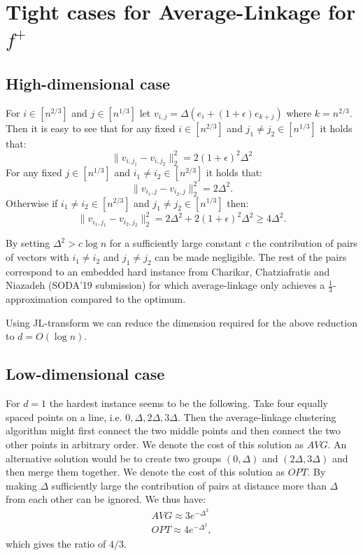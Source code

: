 \documentclass{article}
\begin{document}
\section{Tight cases for Average-Linkage for $f^+$}

\subsection{High-dimensional case}
For $i \in [n^{2/3}]$ and $j \in [n^{1/3}]$ let $v_{i,j} = \Delta (e_i + (1 + \epsilon)e_{k + j})$ where $k = n^{2/3}$.
Then it is easy to see that for any fixed $i \in [n^{2/3}]$ and $j_1 \neq j_2 \in [n^{1/3}]$ it holds that:
$$\|v_{i,j_1} - v_{i, j_2}\|_2^2 = 2 (1 + \epsilon)^2 \Delta^2$$
For any fixed $j \in [n^{1/3}]$ and $i_1 \neq i_2 \in [n^{2/3}]$ it holds that:
$$\|v_{i_1, j} - v_{i_2,j}\|_2^2 = 2 \Delta^2.$$
Otherwise if $i_1 \neq i_2 \in [n^{2/3}]$ and $j_1 \neq j_2  \in [n^{1/3}]$ then:
$$\|v_{i_1, j_1} - v_{i_2, j_2}\|_2^2 = 2 \Delta^2 + 2 (1 + \epsilon)^2 \Delta^2 \ge 4 \Delta^2.$$

By setting $\Delta^2 > c \log n$ for a sufficiently large constant $c$ the contribution of pairs of vectors with $i_1 \neq i_2$ and $j_1 \neq j_2$ can be made negligible. 
The rest of the pairs correspond to an embedded hard instance from Charikar, Chatziafratis and Niazadeh (SODA'19 submission) for which average-linkage only achieves a $\frac13$-approximation compared to the optimum.

Using JL-transform we can reduce the dimension required for the above reduction to $d = O(\log n)$.

\subsection{Low-dimensional case}

For $d = 1$ the hardest instance seems to be the following.
Take four equally spaced points on a line, i.e. $0, \Delta, 2\Delta, 3 \Delta$.
Then the average-linkage clustering algorithm might first connect the two middle points and then connect the two other points in arbitrary order.
We denote the cost of this solution as $AVG$.
An alternative solution would be to create two groups $(0, \Delta)$ and $(2\Delta, 3\Delta)$ and then merge them together.
We denote the cost of this solution as $OPT$.
By making $\Delta$ sufficiently large the contribution of pairs at distance more than $\Delta$ from each other can be ignored. We thus have:
\begin{align*}
AVG \approx 3 e^{-\Delta^2} \\
OPT \approx 4 e^{- \Delta^2},
\end{align*}
which gives the ratio of $4/3$.
\end{document}
